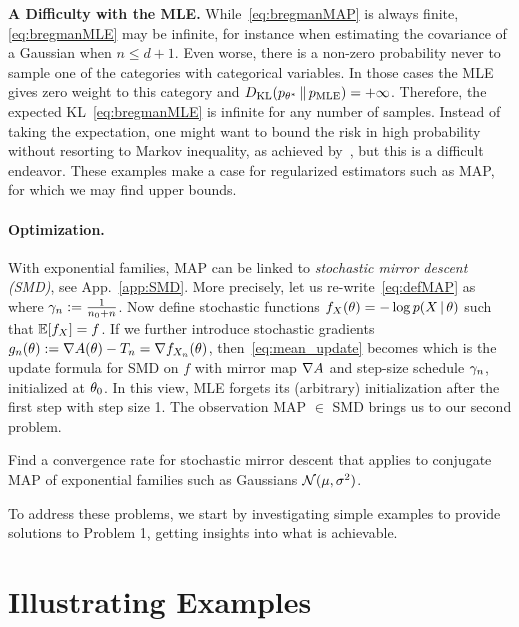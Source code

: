 {\bf A Difficulty with the MLE.}
While~\eqref{eq:bregmanMAP} is always finite, \eqref{eq:bregmanMLE} may be infinite,
for instance when estimating the covariance of a Gaussian when $n \leq d + 1$.
Even worse, there is a non-zero probability never to sample one of the categories with categorical variables.
In those cases the MLE gives zero weight to this category and $D_{\mathrm{KL}}(p_{\theta^*} \,\Vert\, p_\text{MLE} ) = +\infty$.
Therefore, the expected KL~\eqref{eq:bregmanMLE} is infinite for any number of samples.
Instead of taking the expectation, one might want to bound the risk in high probability
without resorting to Markov inequality, as achieved by~\citep{ostrovskii2021finite},
 but this is a difficult endeavor.
These examples make a case for regularized estimators such as MAP,
for which we may find upper bounds.

\paragraph{Optimization.}
With exponential families, MAP can be linked to \emph{stochastic mirror descent (SMD)}, see App.~\ref{app:SMD}.
More precisely, let us re-write~\eqref{eq:defMAP} as
where $\gamma_n := \frac{1}{n_0 + n}$.
Now define stochastic functions $f_X(\theta) = -\log p(X \,\vert\, \theta)$ such that $\operatorname{\mathbb{E}}[f_X] = f$.
If we further introduce stochastic gradients $g_n(\theta) := \nabla A(\theta) - T_n = \nabla f_{X_n}(\theta)$, then~\eqref{eq:mean_update} becomes
which is the update formula for SMD on $f$ with mirror map $\nabla A$
and step-size schedule $\gamma_n$, initialized at $\theta_0$.
In this view, MLE forgets its (arbitrary) initialization after the first step with step size 1.
The observation MAP $\in$ SMD brings us to our second problem.
\begin{problem}
Find a convergence rate for stochastic mirror descent that applies to conjugate MAP of exponential families such as Gaussians ${\mathcal N}(\mu, \sigma^2)$.
\end{problem}

To address these problems, we start by investigating simple examples to provide solutions to Problem 1, getting insights into what is achievable.

\section{Illustrating Examples}\label{sec:example}
